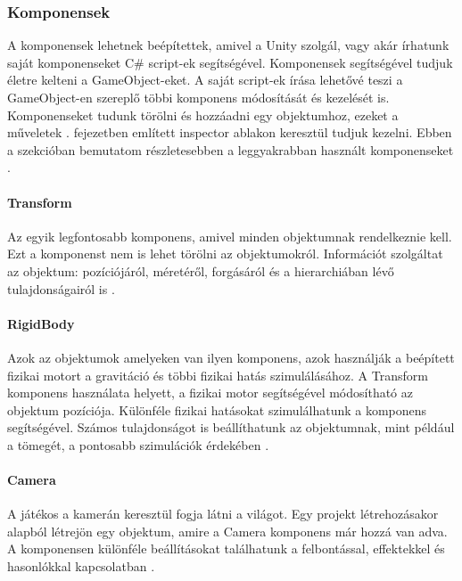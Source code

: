 \documentclass[]{thesis-ekf}
\theoremstyle{definition}
\theoremstyle{remark}
\begin{document}
\subsubsection{Komponensek}

A komponensek lehetnek beépítettek, amivel a Unity szolgál, vagy akár írhatunk saját komponenseket C\# script-ek segítségével. Komponensek segítségével tudjuk életre kelteni a GameObject-eket. A saját script-ek írása lehetővé teszi a GameObject-en szereplő többi komponens módosítását és kezelését is. Komponenseket tudunk törölni és hozzáadni egy objektumhoz, ezeket a műveletek . fejezetben említett inspector ablakon keresztül tudjuk kezelni. Ebben a szekcióban bemutatom részletesebben a leggyakrabban használt komponenseket \cite{UnityComponents}.

\paragraph{Transform}

Az egyik legfontosabb komponens, amivel minden objektumnak rendelkeznie kell. Ezt a komponenst nem is lehet törölni az objektumokról. Információt szolgáltat az objektum: pozíciójáról, méretéről, forgásáról és a hierarchiában lévő tulajdonságairól is \cite{UnityTransform}.
	
\paragraph{RigidBody}

Azok az objektumok amelyeken van ilyen komponens, azok használják a beépített fizikai motort a gravitáció és többi fizikai hatás szimulálásához. A Transform komponens használata helyett, a fizikai motor segítségével módosítható az objektum pozíciója. Különféle fizikai hatásokat szimulálhatunk a komponens segítségével. Számos tulajdonságot is beállíthatunk az objektumnak, mint például a tömegét, a pontosabb szimulációk érdekében \cite{UnityRigidbody}.

\paragraph{Camera}

A játékos a kamerán keresztül fogja látni a világot. Egy projekt létrehozásakor alapból létrejön egy objektum, amire a Camera komponens már hozzá van adva. A komponensen különféle beállításokat találhatunk a felbontással, effektekkel és hasonlókkal kapcsolatban \cite{UnityCamera}.
\end{document}
